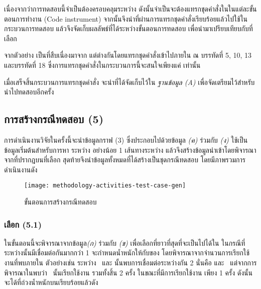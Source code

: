 เนื่องจากว่าการทดสอบนี้จำเป็นต้องครอบคลุม{\Path}ระหว่าง{\CUT} ดังนั้นจำเป็นจะต้องแทรกชุดคำสั่งใน{\sourcecode}ในแต่ละขั้นตอนการทำงาน 
(Code instrument) จากนั้นจึงนำ{\sourcecode}ที่ผ่านการแทรกชุดคำสั่งเรียบร้อยแล้วไปใช้ในกระบวนการทดสอบ 
แล้วจึงจัดเก็บผลลัพธ์ที่ได้ระหว่างขั้นตอนการทดสอบ เพื่อนำมาเปรียบเทียบกับ{\TestPath}ที่เลือก

\begin{figure}[hbt!]
    \lstset{style=thesiscodestyle}
    
    \caption{{\class} }
    \label{fig:javaBonusScoreInstrumented}
\end{figure}

จากตัวอย่าง เป็น{\sourcecode}ที่สืบเนื่องมาจาก
แต่ต่างกันโดยแทรกชุดคำสั่งเข้าไปภายใน{\sourcecode} ณ บรรทัดที่ 5, 10, 13 และบรรทัดที่ 18 ซึ่งการแทรกชุดคำสั่งในกระบวนการนี้จะสนใจเพียงแค่{\CUT} เท่านั้น

เมื่อเสร็จสิ้นกระบวนการแทรกชุดคำสั่ง จะนำ{\sourcecode}ที่ได้จัดเก็บไว้ใน {\it ฐานข้อมูล (A)} เพื่อจัดเตรียมไว้สำหรับนำไปทดสอบอีกครั้ง

\clearpage
\subsection{การสร้างกรณีทดสอบ (5)}

การดำเนินงานวิจัยในครั้งนี้จะนำข้อมูลกราฟ (3) ซึ่งประกอบไปด้วยข้อมูล {\it {\scg} (ค)} ร่วมกับ{\it {\cfg} (ง)} ใช้เป็นข้อมูลเริ่มต้นสำหรับการหา{\TestPath}
ระหว่าง{\CUT} อย่างน้อย 1 เส้นทางระหว่าง{\class} แล้วจึงสร้างข้อมูลนำเข้าโดยพิจารณาจาก{\PredicateNode}ที่ปรากฎบน{\TestPath}ที่เลือก 
สุดท้ายจึงนำข้อมูลทั้งหมดที่ได้สร้างเป็นชุดกรณีทดสอบ โดยมีภาพรวมการดำเนินงานดัง {}

\begin{figure}[ht!]
    \centering
    \texttt{[image: methodology-activities-test-case-gen]}
    \caption{ขั้นตอนการสร้างกรณีทดสอบ}
    \label{fig:testcaseGenerationActivity}
\end{figure}

\subsubsection{เลือก{\TestPath} (5.1)}

ในขั้นตอนนี้จะพิจารณาจากข้อมูล{\it \scg (ก)} ร่วมกับ {\it \cfg (ข)} เพื่อเลือก{\TestPath}ที่ยาวที่สุดที่จะเป็นไปได้ใน{\scg} 
ในกรณีที่ระหว่าง{\CUT}นั้นมี{\Path}เชื่อมต่อกันมากกว่า 1 {\Path} จะกำหนดน้ำหนักให้กับ{\Edge}ของ{\scg} โดยพิจารณาจากจำนวนการเรียกใช้งานที่พบภายใน{\cfg} 
ตัวอย่างเช่น ระหว่าง\class\  และ นั้นพบการเชื่อมต่อระหว่างกัน 2 {\method} นั่นคือ
 และ\  แต่จากการพิจารณาใน{\sourcecode}พบว่า{\class}\  นั้นเรียกใช้งาน\method
{} รวมทั้งสิ้น 2 ครั้ง ในขณะที่มีการเรียกใช้งาน  เพียง 1 ครั้ง ดังนั้นจะได้{\scg}ที่ถ่วงน้ำหนักบน{\Edge}เรียบร้อยแล้วดัง 

